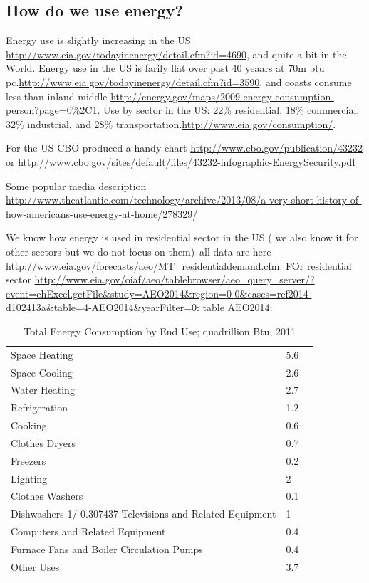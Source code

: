 \documentclass[10pt, letterpaper]{article}
\begin{document}
\begin{spacing}{1.4}
\section{How do we use energy?}

Energy use is slightly increasing in the US
\url{http://www.eia.gov/todayinenergy/detail.cfm?id=4690}, and quite a bit in
the World. 
Energy use in the US is farily flat over past 40 yeaars at 70m btu
pc.\url{http://www.eia.gov/todayinenergy/detail.cfm?id=3590}, and coasts consume
less than inland middle
\url{http://energy.gov/maps/2009-energy-consumption-person?page=0%2C1}. 
Use by sector in the US: 22\% residential, 18\% commercial, 32\% industrial, and
28\% transportation.\url{http://www.eia.gov/consumption/}. 


For the US CBO produced a handy chart \url{http://www.cbo.gov/publication/43232} or \url{http://www.cbo.gov/sites/default/files/43232-infographic-EnergySecurity.pdf}

Some popular media description
\url{http://www.theatlantic.com/technology/archive/2013/08/a-very-short-history-of-how-americans-use-energy-at-home/278329/}

We know how energy is used in residential sector in the US ( we also know it for
other sectors but we do not focus on them)--all data are here
\url{http://www.eia.gov/forecasts/aeo/MT_residentialdemand.cfm}. FOr residential
sector
\url{http://www.eia.gov/oiaf/aeo/tablebrowser/aeo_query_server/?event=ehExcel.getFile&study=AEO2014&region=0-0&cases=ref2014-d102413a&table=4-AEO2014&yearFilter=0}:
table AEO2014: 


\begin{table}[H]\centering\footnotesize
\caption{\label{freq_im_god} Total Energy Consumption by End Use; quadrillion
  Btu, 2011}
\begin{tabular}{lll}   \hline 
Space Heating&	5.6\\
Space Cooling&	2.6\\
Water Heating&	2.7\\
Refrigeration&	1.2\\
Cooking&	0.6\\
Clothes Dryers&	0.7\\
Freezers&	0.2\\
Lighting&	2\\
Clothes Washers&	0.1\\
Dishwashers 1/	0.307437
Televisions and Related Equipment&	1\\
Computers and Related Equipment &	0.4\\
Furnace Fans and Boiler Circulation Pumps&	0.4\\
Other Uses&	3.7\\\hline
\end{tabular}\end{table}


\end{spacing}
\end{document}
